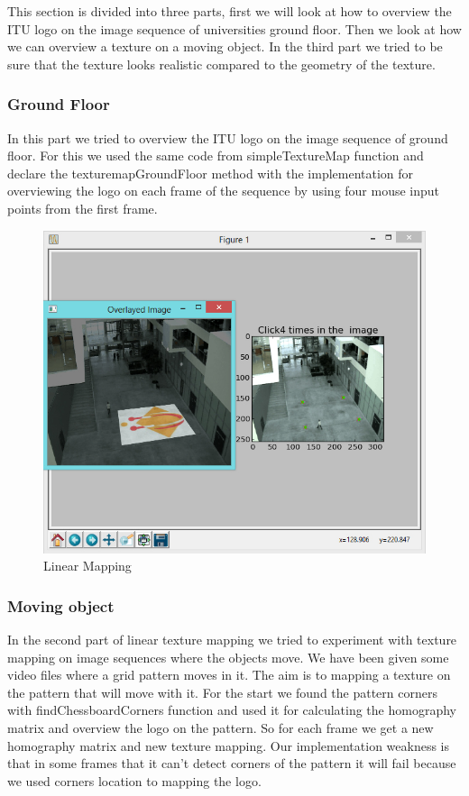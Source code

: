 This section is divided into three parts, first we will look at how to overview the ITU logo on the image sequence of universities ground floor. Then we look at how we can overview a texture on a moving object. In the third part we tried to be sure that the texture looks realistic compared to the geometry of the texture.

\subsubsection{Ground Floor}

In this part we tried to overview the ITU logo on the image sequence of ground floor. For this we used the same code from simpleTextureMap function and declare the texturemapGroundFloor method with the implementation for overviewing the logo on each frame of the sequence by using four mouse input points from the first frame.

\begin{figure}[h!]
	\centering
	\includegraphics[width=\textwidth]{final/images/linearmapping.jpg}
	\caption{Linear Mapping}
	\label{fig:linearmapping}
\end{figure}

\subsubsection{Moving object}

In the second part of linear texture mapping we tried to experiment with texture mapping on image sequences where the objects move. We have been given some video files where a grid pattern moves in it. The aim is to mapping a texture on the pattern that will move with it. For the start we found the pattern corners with findChessboardCorners function and used it for calculating the homography matrix and overview the logo on the pattern. So for each frame we get a new homography matrix and new texture mapping. Our implementation weakness is that in some frames that it can't detect corners of the pattern it will fail because we used corners location to mapping the logo.

